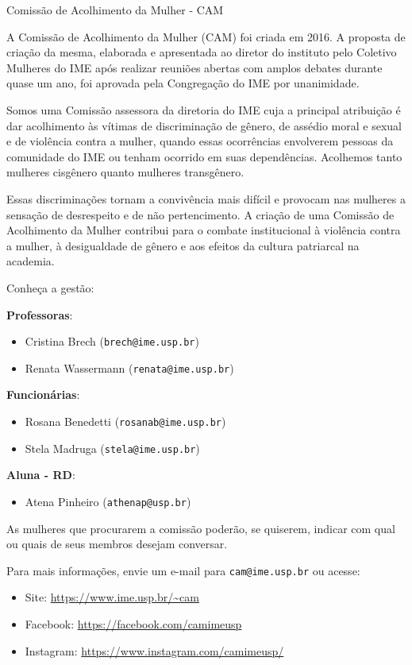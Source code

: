\begin{subsecao}{Comissão de Acolhimento da Mulher - CAM}

A Comissão de Acolhimento da Mulher (CAM) foi criada em 2016. A proposta de 
criação da mesma, elaborada e apresentada ao diretor do instituto pelo 
Coletivo Mulheres do IME após realizar reuniões abertas com amplos debates 
durante quase um ano, foi aprovada pela Congregação do IME por unanimidade.

Somos uma Comissão assessora da diretoria do IME cuja a principal atribuição 
é dar acolhimento às vítimas de discriminação de gênero, de assédio moral e 
sexual e de violência contra a mulher, quando essas ocorrências envolverem 
pessoas da comunidade do IME ou tenham ocorrido em suas dependências. Acolhemos
tanto mulheres cisgênero quanto mulheres transgênero.

Essas discriminações tornam a convivência mais difícil e provocam nas mulheres
a sensação de desrespeito e de não pertencimento. A criação de uma Comissão de 
Acolhimento da Mulher contribui para o combate institucional à violência contra
a mulher, à desigualdade de gênero e aos efeitos da cultura patriarcal na academia.

Conheça a gestão: 

\textbf{Professoras}: 
\vspace{-15pt}
\begin{itemize}
  \item Cristina Brech ({\tt brech@ime.usp.br})
  \item Renata Wassermann ({\tt renata@ime.usp.br})
\end{itemize}

\textbf{Funcionárias}: 
\vspace{-15pt}
\begin{itemize}
  \item Rosana Benedetti ({\tt rosanab@ime.usp.br})
  \item Stela Madruga ({\tt stela@ime.usp.br})
\end{itemize}

\textbf{Aluna - RD}: 
\vspace{-15pt}
\begin{itemize}
  \item Atena Pinheiro ({\tt athenap@usp.br})
\end{itemize}

As mulheres que procurarem a comissão poderão, se quiserem, indicar com qual ou 
quais de seus membros desejam conversar.

Para mais informações, envie um e-mail para {\tt cam@ime.usp.br} ou acesse:
\begin{itemize}
  \item Site: \url{https://www.ime.usp.br/~cam}
  \item Facebook: \url{https://facebook.com/camimeusp}
  \item Instagram: \url{https://www.instagram.com/camimeusp/}
\end{itemize}


\end{subsecao}
